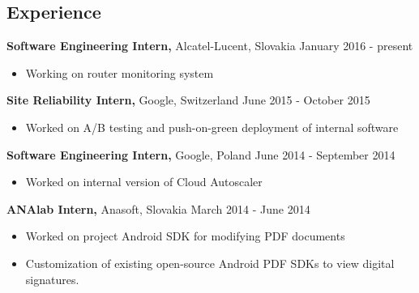 \documentclass[margin]{res}
\begin{document}

\address{{\bf Present Address} \\ VBA 1126 \\ Mlyny, Star\'{e} Grunty 36 \\
        841 04 Bratislava}
\address{{\bf Permanent Address} \\ I. Olbrachta 988/19 \\ 028 01 Trsten\'{a} \\
        +421 904 038 631 \\ pepol@imterra.com}


\begin{resume}


\section{Experience}

{\bf Software Engineering Intern,} Alcatel-Lucent, Slovakia \hfill January 2016 - present
\begin{itemize} \itemsep -2pt %
\item Working on router monitoring system
\end{itemize}

{\bf Site Reliability Intern,} Google, Switzerland \hfill June 2015 - October 2015
\begin{itemize} \itemsep -2pt %
\item Worked on A/B testing and push-on-green deployment of internal software
\end{itemize}

{\bf Software Engineering Intern,} Google, Poland \hfill June 2014 - September 2014
\begin{itemize} \itemsep -2pt %
\item Worked on internal version of Cloud Autoscaler
\end{itemize}

{\bf ANAlab Intern,} Anasoft, Slovakia \hfill March 2014 - June 2014
\begin{itemize} \itemsep -2pt  %
\item Worked on project Android SDK for modifying PDF documents
\item Customization of existing open-source Android PDF SDKs to view digital signatures.
\end{itemize}



\end{resume}
\end{document}
